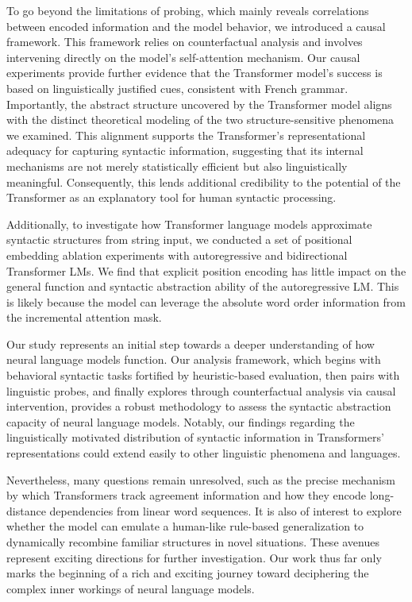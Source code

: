 To go beyond the limitations of probing, which mainly reveals correlations between encoded information and the model behavior, we introduced a causal framework. This framework relies on counterfactual analysis and involves intervening directly on the model's self-attention mechanism. Our causal experiments provide further evidence that the Transformer model's success is based on linguistically justified cues, consistent with French grammar. Importantly, the abstract structure uncovered by the Transformer model aligns with the distinct theoretical modeling of the two structure-sensitive phenomena we examined. This alignment supports the Transformer's representational adequacy for capturing syntactic information, suggesting that its internal mechanisms are not merely statistically efficient but also linguistically meaningful. Consequently, this lends additional credibility to the potential of the Transformer as an explanatory tool for human syntactic processing. 

 
Additionally, to investigate how Transformer language models approximate syntactic structures from string input, we conducted a set of positional embedding ablation experiments with autoregressive and bidirectional Transformer LMs. We find that explicit position encoding has little impact on the general function and syntactic abstraction ability of the autoregressive LM. This is likely because the model can leverage the absolute word order information from the incremental attention mask. 

Our study represents an initial step towards a deeper understanding of how neural language models function. Our analysis framework, which begins with behavioral syntactic tasks fortified by heuristic-based evaluation, then pairs with linguistic probes, and finally explores through counterfactual analysis via causal intervention, provides a robust methodology to assess the syntactic abstraction capacity of neural language models. Notably, our findings regarding the linguistically motivated distribution of syntactic information in Transformers' representations could extend easily to other linguistic phenomena and languages.

Nevertheless, many questions remain unresolved, such as the precise mechanism by which Transformers track agreement information and how they encode long-distance dependencies from linear word sequences. It is also of interest to explore whether the model can emulate a human-like rule-based generalization to dynamically recombine familiar structures in novel situations. These avenues represent exciting directions for further investigation. Our work thus far only marks the beginning of a rich and exciting journey toward deciphering the complex inner workings of neural language models.